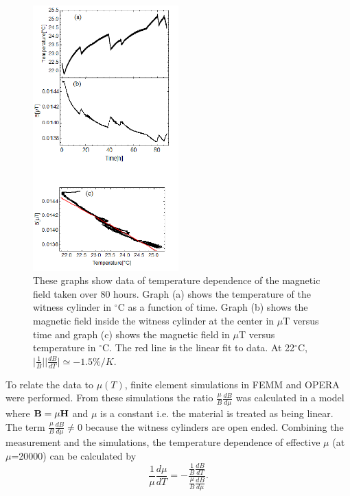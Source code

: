   \begin{figure}[h!]
\begin{center}
   \includegraphics[width=0.5\textwidth]{B_vs_T.png}
    \caption{These graphs show data of temperature dependence of the
      magnetic field taken over 80 hours. Graph (a) shows the
      temperature of the witness cylinder in $^\circ$C as a function
      of time. Graph (b) shows the magnetic field inside the witness
      cylinder at the center in $\mu$T versus time and graph (c) shows
      the magnetic field in $\mu$T versus temperature in
      $^\circ$C. The red line is the linear fit to data. At
      22$^\circ$C, $\vert \frac{1}{B}\vert \vert
      \frac{dB}{dT}\vert\simeq -1.5 \% /K.$ }
    \label{fig:B_vs_Temp}
     \vspace{-2.em}
    \end{center}
\end{figure} 

To relate the data to $\mu(T)$, finite element simulations in FEMM and
OPERA were performed.  From these simulations the ratio $\frac{\mu}{B}
\frac{dB}{d\mu}$ was calculated in a model where $\bold{B}=\mu
\bold{H}$ and $\mu$ is a constant i.e. the material is treated as
being linear. The term $\frac{\mu}{B}\frac{dB}{d\mu}\neq 0$ because
the witness cylinders are open ended. Combining the measurement and
the simulations, the temperature dependence of effective $\mu$ (at
$\mu$=20000) can be calculated by
\begin{equation}
\frac{1}{\mu}\frac{d\mu}{dT}= -\frac{\frac{1}{B}\frac{dB}{dT}}{\frac{\mu}{B}\frac{dB}{d\mu}}.
\end{equation}

